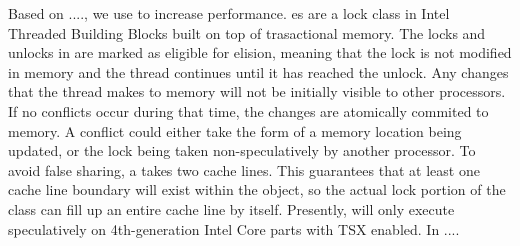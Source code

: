 
Based on ...., we use  to increase performance.
es are a lock class in Intel Threaded Building
Blocks built on top of trasactional memory. The locks and unlocks in
 are marked as eligible for elision, meaning that
the lock is not modified in memory and the thread continues until it has
reached the unlock. Any changes that the thread makes to memory will not be
initially visible to other processors. If no conflicts occur during that time, the changes are atomically commited to memory.
A conflict could either take the form of a memory location being updated, or
the lock being taken non-speculatively by another processor. To avoid false
sharing, a  takes two cache lines. This
guarantees that at least one cache line boundary will exist within the object,
so the actual lock portion of the class can fill up an entire cache line by
itself. Presently,  will only execute
speculatively on 4th-generation Intel Core parts with TSX enabled.
In ....

